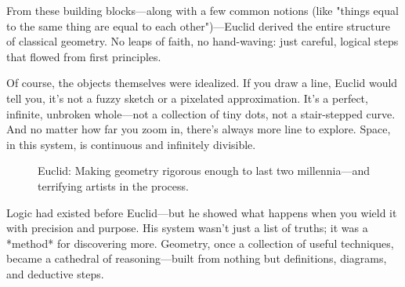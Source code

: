 From these building blocks—along with a few common notions (like "things equal to the same thing are equal to each other")—Euclid derived the entire structure of classical geometry. No leaps of faith, no hand-waving: just careful, logical steps that flowed from first principles.

Of course, the objects themselves were idealized. If you draw a line, Euclid would tell you, it's not a fuzzy sketch or a pixelated approximation. It's a perfect, infinite, unbroken whole—not a collection of tiny dots, not a stair-stepped curve. And no matter how far you zoom in, there’s always more line to explore. Space, in this system, is continuous and infinitely divisible.

\begin{figure}[H]
\centering
{}
\caption{Euclid: Making geometry rigorous enough to last two millennia—and terrifying artists in the process.}
\end{figure}

Logic had existed before Euclid—but he showed what happens when you wield it with precision and purpose. His system wasn’t just a list of truths; it was a *method* for discovering more. Geometry, once a collection of useful techniques, became a cathedral of reasoning—built from nothing but definitions, diagrams, and deductive steps.

